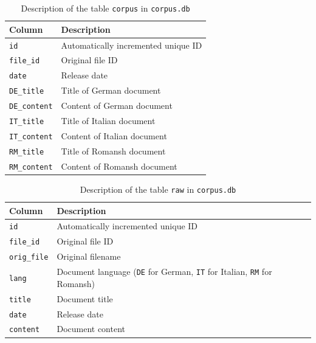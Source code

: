 \begin{table}
\centering
\begin{tabular}{lp{7cm}}
\toprule
Column & Description \\
\midrule
	\texttt{id} & Automatically incremented unique ID \\
	\texttt{file\_id} & Original file ID \\
	\texttt{date}&  Release date \\
	\texttt{DE\_title} &  Title of German document \\
	\texttt{DE\_content} &  Content of German document \\
	\texttt{IT\_title} &  Title of Italian document \\
	\texttt{IT\_content} &  Content of Italian document \\
	\texttt{RM\_title} &  Title of Romansh document \\
	\texttt{RM\_content} &  Content of Romansh document \\
\bottomrule
\end{tabular}
\caption{Description of the table \texttt{corpus} in \texttt{corpus.db}}
\label{tab:corpus.db-corpus}
\end{table}


\begin{table}
\centering
\begin{tabular}{l p{7cm}}
\toprule
Column & Description \\
\midrule
		\texttt{id} & Automatically incremented unique ID \\
		\texttt{file\_id} &  Original file ID \\
		\texttt{orig\_file} & Original filename \\
		\texttt{lang} &  Document language (\texttt{DE} for German, \texttt{IT} for Italian, \texttt{RM} for Romansh) \\
		\texttt{title} &  Document title \\
		\texttt{date} & Release date \\
		\texttt{content} &  Document content \\
\bottomrule
\end{tabular}
\caption{Description of the table \texttt{raw} in \texttt{corpus.db}}
\label{tab:corpus.db-raw}
\end{table}


